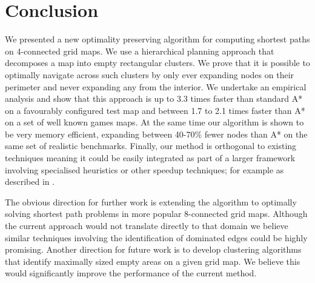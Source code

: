 \section{Conclusion}
We presented a new optimality preserving algorithm for computing shortest paths
on 4-connected grid maps.
We use a hierarchical planning approach that decomposes a map into empty rectangular clusters.
We prove that it is possible to optimally navigate across such clusters by only ever
expanding nodes on their perimeter and never expanding any from the interior.
We undertake an empirical analysis and show that this approach is up to 3.3 times faster than 
standard A* on a favourably configured test map and between 1.7 to 2.1 times faster than A* on 
a set of well known games maps. 
At the same time our algorithm is shown to be very memory efficient, 
expanding between 40-70\% fewer nodes than A* on the same set of realistic benchmarks.
Finally, our method is orthogonal to existing techniques meaning it could be easily integrated
as part of a larger framework involving specialised heuristics or other speedup techniques; for example as described in \cite{bjornsoon05,bjornsson06}. 
\par
The obvious direction for further work is extending the algorithm to optimally solving 
shortest path problems in more popular 8-connected grid maps. 
Although the current approach would not translate directly to that domain we believe similar
techniques involving the identification of dominated edges could be highly promising.
Another direction for future work is to develop clustering algorithms that identify maximally
sized empty areas on a given grid map.
We believe this would significantly improve the performance of the current method.
